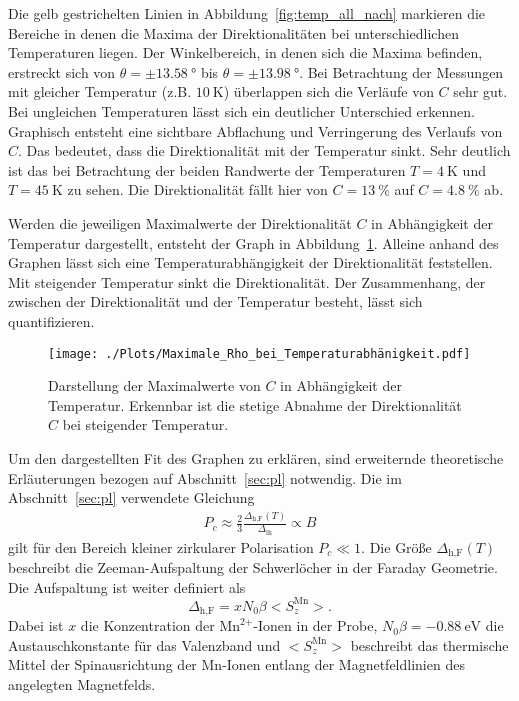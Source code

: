 Die gelb gestrichelten Linien in Abbildung~\ref{fig:temp_all_nach} markieren die Bereiche 
in denen die Maxima der Direktionalitäten
bei unterschiedlichen Temperaturen liegen.
Der Winkelbereich, in denen sich die Maxima befinden, erstreckt sich von  $\theta = \pm \SI{13,58}{\degree} 
$ bis $ \theta = \pm \SI{13,98}{\degree}$.
Bei Betrachtung der Messungen mit gleicher Temperatur (z.B. $\SI{10}{\kelvin}$) 
überlappen sich die Verläufe von $C$ sehr gut.
Bei ungleichen Temperaturen lässt sich ein deutlicher Unterschied erkennen.
Graphisch entsteht eine sichtbare Abflachung und Verringerung des Verlaufs von $C$.
Das bedeutet, dass die Direktionalität mit der Temperatur sinkt.
Sehr deutlich ist das bei Betrachtung der beiden Randwerte 
der Temperaturen $T = \SI{4}{\kelvin}$ und $ T = \SI{45}{\kelvin}$ zu sehen.
Die Direktionalität fällt hier von $C= \SI{13}{\percent}$ auf $C = \SI{4,8}{\percent}$ ab.

Werden die jeweiligen Maximalwerte der Direktionalität $C$ in Abhängigkeit
der Temperatur dargestellt, entsteht der Graph in Abbildung~\ref{fig:fit}.
Alleine anhand des Graphen lässt sich eine Temperaturabhängigkeit der Direktionalität
feststellen.
Mit steigender Temperatur sinkt die Direktionalität.
Der Zusammenhang, der zwischen der Direktionalität und der Temperatur besteht, lässt sich 
quantifizieren.
\begin{figure}
    \centering
    \texttt{[image: ./Plots/Maximale\_Rho\_bei\_Temperaturabhänigkeit.pdf]}
    \caption{Darstellung der Maximalwerte von $C$ in Abhängigkeit der Temperatur.
    Erkennbar ist die stetige Abnahme der Direktionalität $C$ bei steigender Temperatur.}
    \label{fig:fit}
\end{figure}
\FloatBarrier

Um den dargestellten Fit des Graphen zu erklären,
sind erweiternde theoretische Erläuterungen bezogen auf Abschnitt~\ref{sec:pl} notwendig.
Die im Abschnitt~\ref{sec:pl} verwendete Gleichung 
\begin{align*}
    P_c \approx \frac{2}{3} \frac{\Delta_\text{h,F}(T)}{\Delta_\text{lh}} \propto B
\end{align*}
gilt für den Bereich kleiner zirkularer Polarisation $P_{c}\ll 1$. 
Die Größe $\Delta_\text{h,F}(T)$ beschreibt die 
Zeeman-Aufspaltung der Schwerlöcher in der Faraday Geometrie.
Die Aufspaltung ist weiter definiert als~\cite{nature} 
\begin{equation}
    \Delta_\text{h,F} = xN_0\beta \bigl< S^\text{Mn}_{z} \bigr>.
\end{equation}
Dabei ist $x$ die Konzentration der $\text{Mn}^\text{2+}\text{-Ionen}$ in der Probe,
$N_0\beta = -\SI{0.88}{\eV}$ die Austauschkonstante für das Valenzband und 
$\bigl< S^\text{Mn}_{z} \bigr>$ beschreibt das thermische Mittel der Spinausrichtung
der Mn-Ionen entlang der Magnetfeldlinien des angelegten Magnetfelds.

